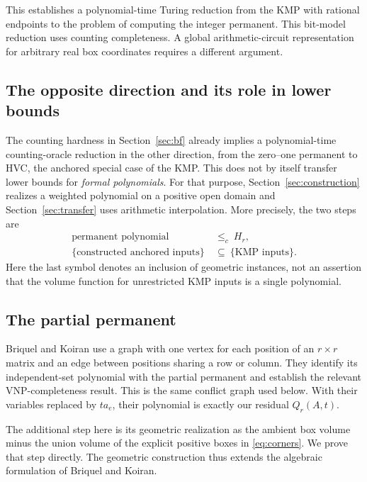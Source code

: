 \documentclass[12pt,a4paper]{article}
\theoremstyle{definition}
\theoremstyle{remark}
\newcommand{\VNP}{\mathrm{VNP}}
\begin{document}
This establishes a polynomial-time Turing reduction from the KMP with
rational endpoints to the problem of computing the integer permanent.
This bit-model reduction uses counting completeness. A global
arithmetic-circuit representation for arbitrary real box coordinates
requires a different argument.

\subsection{The opposite direction and its role in lower bounds}

The counting hardness in Section~\ref{sec:bf} already implies a
polynomial-time counting-oracle reduction in the other direction,
from the zero--one permanent to HVC, the anchored special case of the KMP.
This does not by itself transfer lower bounds for \emph{formal polynomials}.
For that purpose, Section~\ref{sec:construction} realizes a weighted
polynomial on a positive open domain and Section~\ref{sec:transfer}
uses arithmetic interpolation. More precisely, the two steps are
\[
 \begin{aligned}
 \text{permanent polynomial}&\ \le_c\ H_r,\\
 \{\text{constructed anchored inputs}\}&\ \subseteq\
 \{\text{KMP inputs}\}.
 \end{aligned}
\]
Here the last symbol denotes an inclusion of geometric instances,
not an assertion that the volume function for unrestricted KMP inputs
is a single polynomial.

\subsection{The partial permanent}

Briquel and Koiran \cite[Section 3, Theorems 3 and 5]{BriquelKoiran2009}
use a graph with one vertex for each position of an $r\times r$ matrix
and an edge between positions sharing a row or column. They identify
its independent-set polynomial with the partial permanent and establish
the relevant $\VNP$-completeness result. This is the same conflict graph
used below. With their variables replaced by $ta_e$, their polynomial
is exactly our residual $Q_r(A,t)$.

The additional step here is its geometric realization as the ambient
box volume minus the union volume of the explicit positive boxes in
\eqref{eq:corners}. We prove that step directly. The geometric construction thus extends the algebraic formulation
of Briquel and Koiran.
\end{document}
